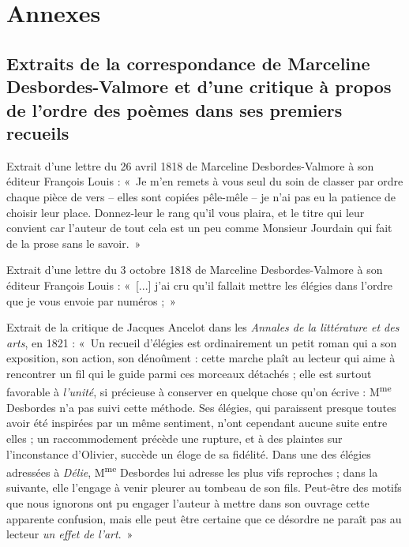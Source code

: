 \documentclass[final, fra]{anthology-ch}     %
\begin{document}
\printbibliography

\appendix

\section{Annexes} \label{appdx:first}

\subsection{Extraits de la correspondance de Marceline Desbordes-Valmore et d'une critique à propos de l'ordre des poèmes dans ses premiers recueils}

Extrait d'une lettre du 26 avril 1818 de Marceline Desbordes-Valmore à son éditeur François Louis : «~Je m’en remets à vous seul du soin de classer par ordre chaque pièce de vers – elles sont copiées pêle-mêle – je n’ai pas eu la patience de choisir leur place. Donnez-leur le rang qu’il vous plaira, et le titre qui leur convient car l’auteur de tout cela est un peu comme Monsieur Jourdain qui fait de la prose sans le savoir.~»~\cite{Cavallucci1936}

Extrait d'une lettre du 3 octobre 1818 de Marceline Desbordes-Valmore à son éditeur François Louis : «~[...] j’ai cru qu’il fallait mettre les élégies dans l’ordre que je vous envoie par numéros ;~»~\cite{Cavallucci1936}

Extrait de la critique de Jacques Ancelot dans les \emph{Annales de la littérature et des arts}, en 1821 : «~Un recueil d'élégies est ordinairement un petit roman qui a son exposition, son action, son dénoûment : cette marche plaît au lecteur qui aime à rencontrer un fil qui le guide parmi ces morceaux détachés ; elle est surtout favorable à \emph{l'unité}, si précieuse à conserver en quelque chose qu'on écrive : M\textsuperscript{me} Desbordes n'a pas suivi cette méthode. Ses élégies, qui paraissent presque toutes avoir été inspirées par un même sentiment, n'ont cependant aucune suite entre elles ; un raccommodement précède une rupture, et à des plaintes sur l'inconstance d'Olivier, succède un éloge de sa fidélité. Dans une des élégies adressées à \emph{Délie}, M\textsuperscript{me} Desbordes lui adresse les plus vifs reproches ; dans la suivante, elle l'engage à venir pleurer au tombeau de son fils. Peut-être des motifs que nous ignorons ont pu engager l'auteur à mettre dans son ouvrage cette apparente confusion, mais elle peut être certaine que ce désordre ne paraît pas au lecteur \emph{un effet de l'art}.~»~\cite{Ancelot1821}
\end{document}
